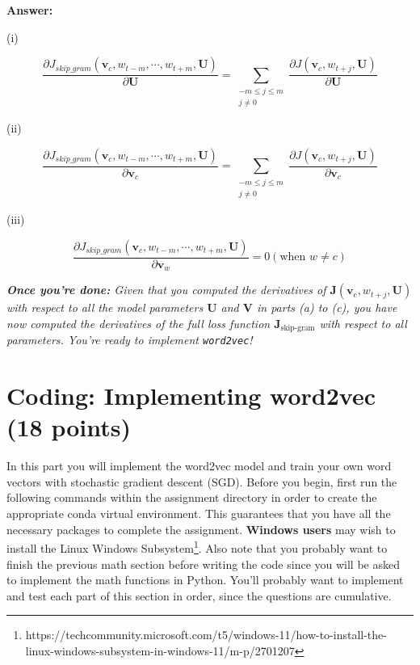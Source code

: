 \documentclass{article}
\newenvironment{answer}{
    {\bf Answer:} \sf \begingroup\color{red}
}{\endgroup}%
\begin{document}
\begin{enumerate}[label=(\alph*)]
\begin{shaded}
\begin{answer}

    (i)

    \begin{equation}
        \frac{\partial{J_{skip\_gram}(\bm v_c,w_{t-m},\cdots,w_{t+m},\bm U)}}{\partial{\bm U}}
        =
        \sum_{\substack{-m\leq j\leq m \\ j \neq 0}} \frac{\partial{J(\bm v_c,w_{t+j},\bm U)}}{\partial{\bm U}}\label{eq:1i1}
    \end{equation}

    (ii)

    \begin{equation}
        \frac{\partial{J_{skip\_gram}(\bm v_c,w_{t-m},\cdots,w_{t+m},\bm U)}}{\partial{\bm v_c}}
        =
        \sum_{\substack{-m\leq j\leq m \\ j \neq 0}} \frac{\partial{J(\bm v_c,w_{t+j},\bm U)}}{\partial{\bm v_c}}\label{eq:1i2}
    \end{equation}

    (iii)

    \begin{equation}
        \frac{\partial{J_{skip\_gram}(\mathbf{v}_c,w_{t-m},\cdots,w_{t+m},\bm U)}}{\partial{\bm v_w}}
        =
        0 (\text{when } w\neq c)\label{eq:1i3}
    \end{equation}

\end{answer}
\end{shaded}

\textit{\textbf{Once you're done:} Given that you computed the derivatives of $\bm J(\bm v_c, w_{t+j}, \bm U)$ with respect to all the model parameters $\bm U$ and $\bm V$ in parts (a) to (c), you have now computed the derivatives of the full loss function $\bm J_{\text{skip-gram}}$ with respect to all parameters. You're ready to implement \texttt{word2vec}!} %

\end{enumerate}

\section{Coding: Implementing word2vec (18 points)}
In this part you will implement the word2vec model and train your own word vectors with stochastic gradient descent (SGD). Before you begin, first run the following commands within the assignment directory in order to create the appropriate conda virtual environment. This guarantees that you have all the necessary packages to complete the assignment. \textbf{Windows users} may wish to install the Linux Windows Subsystem\footnote{https://techcommunity.microsoft.com/t5/windows-11/how-to-install-the-linux-windows-subsystem-in-windows-11/m-p/2701207}. Also note that you probably want to finish the previous math section before writing the code since you will be asked to implement the math functions in Python. You’ll probably want to implement and test each part of this section in order, since the questions are cumulative.
\end{document}
